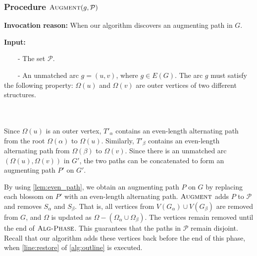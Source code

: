 \documentclass{article}
\newcommand{\alp}{\alpha}
\newcommand{\Omg}{\Omega}
\newcommand{\calP}{\mathcal{P}}
\newcommand{\algPhase}{\textsc{Alg-Phase}\xspace}
\newcommand{\algAugment}{\textsc{Augment}\xspace}
\newcommand{\mytab}{\ \ \ \ }
\begin{document}
\subsubsection{Procedure $\algAugment(g, \calP)$}
\label{sec:augment}
\begin{minipage}{0.95\linewidth}
    \begin{mdframed}[backgroundcolor=gray!15, linecolor=red!40!black]
    \textbf{Invocation reason:} When our algorithm discovers an augmenting path in $G$.
    
    \textbf{Input:}
    
    \mytab - The set $\calP$.
    
    \mytab - An unmatched arc $g = (u, v)$, where $g \in E(G)$. The arc $g$ must satisfy the following property: $\Omg(u)$ and $\Omg(v)$ are outer vertices of two different structures.
    \end{mdframed}
\end{minipage}
\\\\
Since $\Omg(u)$ is an outer vertex, $T'_\alp$ contains an even-length alternating path from the root $\Omg(\alp)$ to $\Omg(u)$.
Similarly, $T'_\beta$ contains an even-length alternating path from $\Omg(\beta)$ to $\Omg(v)$.
Since there is an unmatched arc $(\Omg(u), \Omg(v))$ in $G'$, the two paths can be concatenated to form an augmenting path $P'$ on $G'$.

By using \cref{lem:even_path}, we obtain an augmenting path $P$ on $G$ by replacing each blossom on $P'$ with an even-length alternating path.
$\algAugment$ adds $P$ to $\calP$ and removes $S_\alp$ and $S_\beta$.
That is, all vertices from $V(G_\alp) \cup V(G_\beta)$ are removed from $G$, and $\Omg$ is updated as $\Omg - (\Omg_\alp \cup \Omg_\beta)$.
The vertices remain removed until the end of $\algPhase$.
This guarantees that the paths in $\calP$ remain disjoint.
Recall that our algorithm adds these vertices back before the end of this phase, when \cref*{line:restore} of \cref{alg:outline} is executed.
\end{document}
